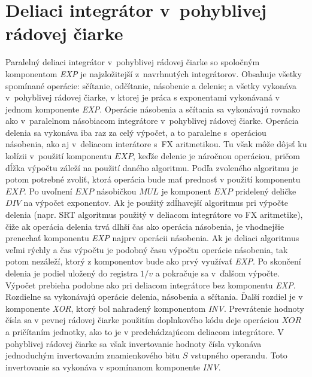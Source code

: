 \section{Deliaci integrátor v~pohyblivej rádovej čiarke}
Paralelný deliaci integrátor v~pohyblivej rádovej čiarke so spoločným komponentom \textit{EXP} je najzložitejší z~navrhnutých integrátorov. Obsahuje všetky spomínané operácie: sčítanie, odčítanie, násobenie a delenie; a všetky vykonáva v~pohyblivej rádovej čiarke, v ktorej je práca s exponentami vykonávaná v jednom komponente \textit{EXP}.
Operácie násobenia a sčítania sa vykonávajú rovnako ako v~paralelnom násobiacom integrátore v~pohyblivej rádovej čiarke. Operácia delenia sa vykonáva iba raz za celý výpočet, a to paralelne s~operáciou násobenia, ako aj v~deliacom interátore s~FX aritmetikou. Tu však môže dôjsť ku kolízii v~použití komponentu $ EXP $, keďže delenie je náročnou operáciou, pričom dĺžka výpočtu záleží na použití daného algoritmu. Podľa zvoleného algoritmu je potom potrebné zvoliť, ktorá operácia bude mať prednosť v použití komponentu $ EXP $. Po uvoľnení $ EXP $ násobičkou $ MUL $ je komponent $ EXP $ pridelený deličke $ DIV $ na výpočet exponentov. Ak je použitý zdĺhavejší algoritmus pri výpočte delenia (napr. SRT algoritmus použitý v deliacom integrátore vo FX aritmetike), čiže ak operácia delenia trvá dlhší čas ako operácia násobenia, je vhodnejšie prenechať komponentu \textit{EXP} najprv operácii násobenia. Ak je deliaci algoritmus veľmi rýchly a čas výpočtu je podobný času výpočtu operácie násobenia, tak potom nezáleží, ktorý z komponentov bude ako prvý využívať \textit{EXP}. Po skončení delenia je podiel uložený do registra $ 1/v $ a pokračuje sa v~ďalšom výpočte.
Výpočet prebieha podobne ako pri deliacom integrátore bez komponentu \textit{EXP}. Rozdielne sa vykonávajú operácie delenia, násobenia a sčítania. Ďalší rozdiel je v komponente \textit{XOR}, ktorý bol nahradený komponentom \textit{INV}. Prevrátenie hodnoty čísla sa v pevnej rádovej čiarke použitím doplnkového kódu deje operáciou $ XOR $ a pričítaním jednotky, ako to je v predchádzajúcom deliacom integrátore. V pohyblivej rádovej čiarke sa však invertovanie hodnoty čísla vykonáva jednoduchým invertovaním znamienkového bitu $ S $ vstupného operandu. Toto invertovanie sa vykonáva v spomínanom komponente \textit{INV}.

